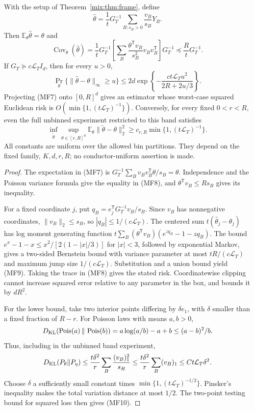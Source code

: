 \begin{theorem}\label{mix:thm:estimator}
With the setup of Theorem~\ref{mix:thm:frame}, define
\[
 \widehat\theta=\frac1tG_T^{-1}
                  \sum_{B:s_B>0}\frac{v_B}{s_B}Y_B.
\tag{MF7}
\]
Then $\mathbb E_\theta\widehat\theta=\theta$ and
\[
 \operatorname{Cov}_\theta(\widehat\theta)
 =\frac1tG_T^{-1}\left[
     \sum_B\frac{\theta^{\mathsf T}v_B}{s_B^2}v_Bv_B^{\mathsf T}
                       \right]G_T^{-1}
 \preceq\frac RtG_T^{-1}.
\tag{MF8}
\]
If $G_T\succeq c\mathcal L_T I_d$, then for every $u>0$,
\[
 \Pr_\theta\{\|\widehat\theta-\theta\|_\infty\ge u\}
 \le2d\exp\left\{-\frac{ct\mathcal L_Tu^2}{2R+2u/3}\right\}.
\tag{MF9}
\]
Projecting (MF7) onto $[0,R]^d$ gives an estimator whose worst-case squared
Euclidean risk is $O(\min\{1,(t\mathcal L_T)^{-1}\})$.  Conversely, for every
fixed $0<r<R$, even the full unbinned experiment restricted to this band satisfies
\[
 \inf_{\widetilde\theta}\sup_{\theta\in[r,R]^d}
 \mathbb E_\theta\|\widetilde\theta-\theta\|_2^2
 \ge c_{r,R}\min\{1,(t\mathcal L_T)^{-1}\}.
\tag{MF10}
\]
All constants are uniform over the allowed bin partitions.  They depend on
the fixed family, $K,d,r,R$; no conductor-uniform assertion is made.
\end{theorem}

\begin{proof}
The expectation in (MF7) is
$G_T^{-1}\sum_Bv_Bv_B^{\mathsf T}\theta/s_B=\theta$.
Independence and the Poisson variance formula give the equality in (MF8),
and $\theta^{\mathsf T}v_B\le Rs_B$ gives its inequality.

For a fixed coordinate $j$, put
$q_B=e_j^{\mathsf T}G_T^{-1}v_B/s_B$.  Since $v_B$ has nonnegative
coordinates, $\|v_B\|_2\le s_B$, so $|q_B|\le1/(c\mathcal L_T)$.
The centered sum $t(\widehat\theta_j-\theta_j)$ has log moment generating
function
$t\sum_B(\theta^{\mathsf T}v_B)(e^{zq_B}-1-zq_B)$.
The bound
$e^x-1-x\le x^2/[2(1-|x|/3)]$ for $|x|<3$, followed by exponential
Markov, gives a two-sided Bernstein bound with variance parameter at most
$tR/(c\mathcal L_T)$ and maximum jump size $1/(c\mathcal L_T)$.
Substitution and a union bound yield (MF9).  Taking the trace in (MF8)
gives the stated risk.  Coordinatewise clipping cannot increase squared
error relative to any parameter in the box, and bounds it by $dR^2$.

For the lower bound, take two interior points differing by
$\delta e_1$, with $\delta$ smaller than a fixed fraction of $R-r$.
For Poisson laws with means $a,b>0$,
\[
 D_{\rm KL}(\operatorname{Pois}(a)\,\|\,\operatorname{Pois}(b))
 =a\log(a/b)-a+b\le(a-b)^2/b.
\]
Thus, including in the unbinned band experiment,
\[
 D_{\rm KL}(P_\theta\|P_\eta)
 \le\frac{t\delta^2}{r}\sum_B\frac{(v_B)_1^2}{s_B}
 \le\frac{t\delta^2}{r}\sum_B(v_B)_1
 \le C t\mathcal L_T\delta^2.
\]
Choose $\delta$ a sufficiently small constant times
$\min\{1,(t\mathcal L_T)^{-1/2}\}$.  Pinsker's inequality makes the total
variation distance at most $1/2$.  The two-point testing bound for squared
loss then gives (MF10).
\end{proof}

